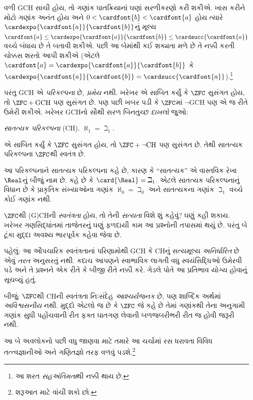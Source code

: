 \documentclass[../../../include/open-logic-section]{subfiles}
\begin{document}
વળી GCH સાચી હોય, તો ગણાંક ઘાતક્રિયાનાં ઘણાં
સરળીકરણો કરી શકીએ. ખાસ કરીને મોટો ગણાંક અનંત
હોય અને
$0<\cardfont{b} < \cardfont{a}$ હોય ત્યારે
$\cardexpo{\cardfont{a}}{\cardfont{b}}$નું મૂલ્ય
$\cardfont{a}\leq \cardexpo{\cardfont{a}}{\cardfont{b}} \leq
\cardsucc{\cardfont{a}}$ વચ્ચે બંધાય છે તે
બતાવી શકીએ. પછી આ બેમાંથી કઈ શક્યતા મળે છે
તે નક્કી કરતી ચોક્કસ શરતો આપી શકીએ
(એટલે $\cardfont{a} =
\cardexpo{\cardfont{a}}{\cardfont{b}}$ કે
$\cardexpo{\cardfont{a}}{\cardfont{b}} =
\cardsucc{\cardfont{a}}$).\footnote{આ શરત
\emph{સહઅંતિમતા}થી નક્કી થાય છે.}

પરંતુ GCH એ \emph{પરિકલ્પના} છે,
\emph{પ્રમેય} નથી. ખરેખર \citet{Godel1938}એ
સાબિત કર્યું કે $\ZFC$ સુસંગત હોય, તો
$\ZFC + \text{GCH}$ પણ સુસંગત છે. પણ પછી
ખબર પડી કે $\ZFC$માં $\lnot$GCH પણ એ જ રીતે
ઉમેરી શકીએ. ખરેખર GCHનો સૌથી સરળ બિનતુચ્છ
\emph{દાખલો} જુઓ:

\begin{defish}
\emph{સાતત્યક પરિકલ્પના} (CH).
$\aleph_1 = \beth_1$.
\end{defish}

\citet{Cohen1963}એ સાબિત કર્યું કે $\ZFC$
સુસંગત હોય, તો $\ZFC + \lnot\text{CH}$ પણ
સુસંગત છે. તેથી સાતત્યક પરિકલ્પના $\ZFC$થી
સ્વતંત્ર છે.

આ પરિકલ્પનાને સાતત્યક પરિકલ્પના કહે છે, કારણ કે
``સાતત્યક'' એ વાસ્તવિક રેખા $\Real$નું બીજું નામ છે.
 કહે છે કે
$\card{\Real} = \beth_1$. એટલે સાતત્યક
પરિકલ્પનાનું વિધાન છે કે પ્રાકૃતિક સંખ્યાઓના ગણાંક
$\aleph_0 = \beth_0$ અને સાતત્યકના ગણાંક
$\beth_1$ વચ્ચે કોઈ ગણાંક નથી.

$\ZFC$થી (G)CHની \emph{સ્વતંત્રતા} હોય, તો
તેની \emph{સત્યતા} વિશે શું કહેવું? ઘણું કહી શકાય.
ખરેખર ગણસિદ્ધાંતમાં તાજેતરનું ઘણું ફળદાયી કામ
આ પ્રશ્નોની તપાસમાં થયું છે. પરંતુ બે ટૂંકા મુદ્દા
અવશ્ય ભારપૂર્વક કહેવા જેવા છે.

પહેલું: આ ઔપચારિક સ્વતંત્રતાનાં પરિણામોથી GCH
કે CHનું સત્યમૂલ્ય \emph{અનિર્ધારિત} છે એવું
\emph{તરત} અનુસરતું નથી. કદાચ આપણને સ્વાભાવિક
લાગતી વધુ સ્વયંસિદ્ધિઓ ઉમેરવી પડે અને તે પ્રશ્નને
એક રીતે કે બીજી રીતે નક્કી કરે. ગેડલે પોતે આ
પ્રતિભાવ યોગ્ય હોવાનું સૂચવ્યું હતું.

બીજું: $\ZFC$થી CHની સ્વતંત્રતા નિઃસંદેહ
\emph{આશ્ચર્યજનક} છે, પણ શાબ્દિક અર્થમાં
\emph{અવિશ્વસનીય} નથી. મુદ્દો એટલો જ છે કે
$\ZFC$ જે કહે છે તેમાં ગણાંકથી તેના અનુગામી
ગણાંક સુધી પહોંચવાની રીત ફક્ત ઘાતગણ લેવાની
બળજબરીભરી રીત જ હોવી જરૂરી નથી.

આ બે અવલોકનો પછી વધુ જાણવા માટે તમારે આ
ચર્ચામાં રસ ધરાવતા વિવિધ તત્ત્વજ્ઞાનીઓ અને
ગણિતજ્ઞો તરફ વળવું પડશે.\footnote{શરૂઆત માટે
\citet[\S15.6]{Potter2004} વાંચી શકો છો.}
\end{document}
